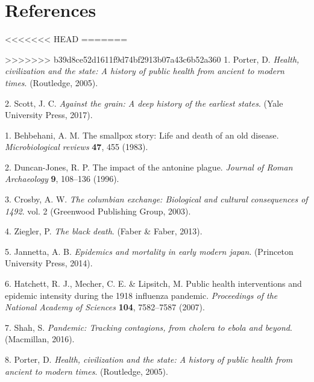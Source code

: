 \documentclass[]{article}
\begin{document}
\hypertarget{references}{%
\section*{References}\label{references}}

\hypertarget{refs}{}
<<<<<<< HEAD
=======
\begin{cslreferences}
>>>>>>> b39d8ce52d1611f9d74bf2913b07a43c6b52a360
\leavevmode\hypertarget{ref-porter2005health}{}%
1. Porter, D. \emph{Health, civilization and the state: A history of public health from ancient to modern times}. (Routledge, 2005).

\leavevmode\hypertarget{ref-scott2017against}{}%
2. Scott, J. C. \emph{Against the grain: A deep history of the earliest states}. (Yale University Press, 2017).

\leavevmode\hypertarget{ref-behbehani1983smallpox}{}%
1. Behbehani, A. M. The smallpox story: Life and death of an old disease. \emph{Microbiological reviews} \textbf{47}, 455 (1983).

\leavevmode\hypertarget{ref-duncan1996impact}{}%
2. Duncan-Jones, R. P. The impact of the antonine plague. \emph{Journal of Roman Archaeology} \textbf{9}, 108--136 (1996).

\leavevmode\hypertarget{ref-crosby2003columbian}{}%
3. Crosby, A. W. \emph{The columbian exchange: Biological and cultural consequences of 1492}. vol. 2 (Greenwood Publishing Group, 2003).

\leavevmode\hypertarget{ref-ziegler2013black}{}%
4. Ziegler, P. \emph{The black death}. (Faber \& Faber, 2013).

\leavevmode\hypertarget{ref-jannetta2014epidemics}{}%
5. Jannetta, A. B. \emph{Epidemics and mortality in early modern japan}. (Princeton University Press, 2014).

\leavevmode\hypertarget{ref-hatchett2007public}{}%
6. Hatchett, R. J., Mecher, C. E. \& Lipsitch, M. Public health interventions and epidemic intensity during the 1918 influenza pandemic. \emph{Proceedings of the National Academy of Sciences} \textbf{104}, 7582--7587 (2007).

\leavevmode\hypertarget{ref-shah2016pandemic}{}%
7. Shah, S. \emph{Pandemic: Tracking contagions, from cholera to ebola and beyond}. (Macmillan, 2016).

\leavevmode\hypertarget{ref-porter2005health}{}%
8. Porter, D. \emph{Health, civilization and the state: A history of public health from ancient to modern times}. (Routledge, 2005).


\end{cslreferences}
\end{document}
